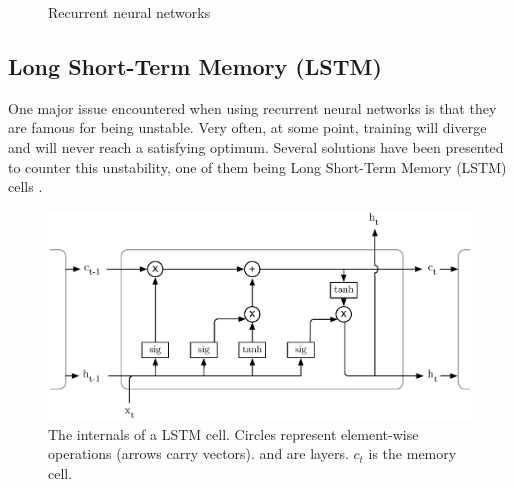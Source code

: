\begin{figure}[]
	\centering
	\qquad
	\caption{Recurrent neural networks}
	\label{fig:rnn}
\end{figure}

\subsection{Long Short-Term Memory (LSTM)}
One major issue encountered when using recurrent neural networks is that they
are famous for being unstable. Very often, at some point, training will diverge
and will never reach a satisfying optimum. Several solutions have been presented
to counter this unstability, one of them being Long Short-Term Memory (LSTM)
cells \cite{lstm}. \\

\begin{figure}
	\centering
	\includegraphics[width=0.8\linewidth]{fig/lstm.eps}
	\caption{The internals of a LSTM cell. Circles represent element-wise
	operations (arrows carry vectors).  and 
	 are layers. $c_t$ is the memory cell.}
	\label{fig:lstm}
\end{figure}

